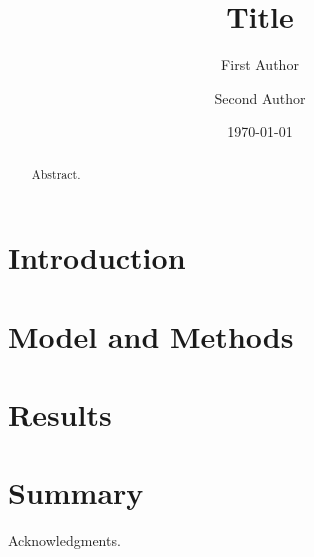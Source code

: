 \documentclass[twocolumn, prb, amsmath, amssymb, superscriptaddress]{revtex4-2}
\begin{document}

\title{Title}

\author{First Author}
\author{Second Author}

\date{\today}

\begin{abstract}
  Abstract.
\end{abstract}

\maketitle

\section{Introduction}
\label{sec:introduction}


\section{Model and Methods}
\label{sec:model}


\section{Results}
\label{sec:results}


\section{Summary}
\label{sec:summary}


\begin{acknowledgments}
  Acknowledgments.
\end{acknowledgments}


\end{document}
